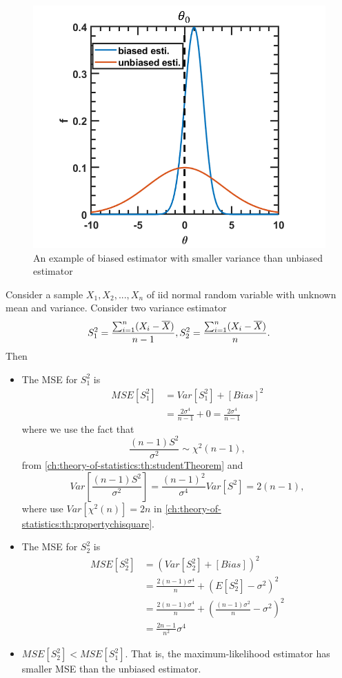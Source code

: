 \begin{refsection}
\begin{figure}[H]
	\centering
	\includegraphics[width=0.6\linewidth]{../figures/statisticalModeling/estimationTheory/unbiasedBiasedEstimatorModified}
	\caption{An example of biased estimator with smaller variance than unbiased estimator}
	\label{ch:theory-of-statistics:fig:unbiasedbiasedestimatorComparison}
\end{figure}

\begin{example}
	Consider a sample $X_1,X_2,...,X_n$ of iid normal random variable with unknown mean and variance. 
	Consider two variance estimator $$S_1^2 = \frac{\sum_{i=1}^{n} (X_i - \overline{X})}{n-1}, S_2^2 = \frac{\sum_{i=1}^{n} (X_i - \overline{X})}{n}.$$
	Then
	\begin{itemize}
		\item The MSE for $S_1^2$ is
		\begin{align*}
		MSE[S_1^2] &= Var[S_1^2] + [Bias]^2 \\
		&= \frac{2\sigma^4}{n-1} + 0 = \frac{2\sigma^4}{n-1}
		\end{align*}
		where we use the fact that 
		$$\frac{(n-1)S^2}{\sigma^2}\sim \chi^2({n-1}),$$
		from \autoref{ch:theory-of-statistics:th:studentTheorem} and
		$$Var[\frac{(n-1)S^2}{\sigma^2}] = \frac{(n-1)^2}{\sigma^4}Var[S^2] = 2(n-1),$$
		where use $Var[\chi^2(n)] = 2n$ in \autoref{ch:theory-of-statistics:th:propertychisquare}.
		\item The MSE for $S_2^2$ is
		\begin{align*}
		MSE[S_2^2] &= (Var[S_2^2] + [Bias])^2 \\
		&= \frac{2(n-1)\sigma^4}{n} + (E[S_2^2] - \sigma^2)^2 \\
		&= \frac{2(n-1)\sigma^4}{n} + (\frac{(n-1)\sigma^2}{n} - \sigma^2)^2 \\
		&= \frac{2n-1}{n^2}\sigma^4
		\end{align*}
		\item $MSE[S_2^2] < MSE[S_1^2]$. That is, the maximum-likelihood estimator has smaller MSE than the unbiased estimator.
		

\end{itemize}
\end{example}
\end{refsection}

